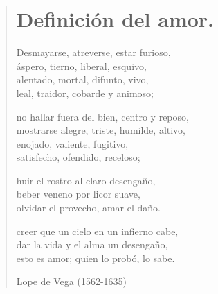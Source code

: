 \documentclass[12pt, twoside]{book}
\begin{document}
\newpage
\begin{verse}
\begin{center}
\section{Definición del amor.}
\end{center}
Desmayarse, atreverse, estar furioso,\\
áspero, tierno, liberal, esquivo,\\
alentado, mortal, difunto, vivo,\\
leal, traidor, cobarde y animoso;
\newline

no hallar fuera del bien, centro y reposo,\\
mostrarse alegre, triste, humilde, altivo,\\
enojado, valiente, fugitivo,\\
satisfecho, ofendido, receloso;
\newline

huir el rostro al claro desengaño,\\
beber veneno por licor suave,\\
olvidar el provecho, amar el daño.
\newline

creer que un cielo en un infierno cabe,\\
dar la vida y el alma un desengaño,\\
esto es amor; quien lo probó, lo sabe.
\newline

Lope de Vega (1562-1635)
\end{verse}
\end{document}
